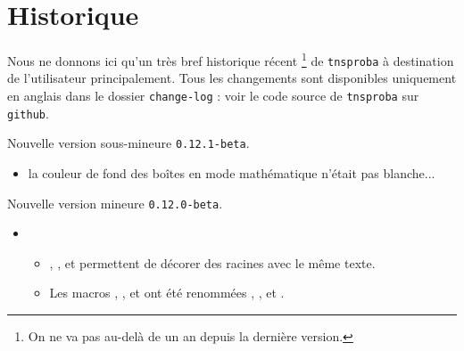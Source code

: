 \documentclass[12pt,a4paper]{article}
\begin{document}
\newpage

\section{Historique}

Nous ne donnons ici qu'un très bref historique récent
\footnote{
	On ne va pas au-delà de un an depuis la dernière version.
}
de \verb+tnsproba+ à destination de l'utilisateur principalement.
Tous les changements sont disponibles uniquement en anglais dans le dossier \verb+change-log+ : voir le code source de \verb+tnsproba+ sur \verb+github+.

\begin{description}

    \medskip
    \item[2021-03-23] Nouvelle version sous-mineure \verb+0.12.1-beta+.
    
    \begin{itemize}[itemsep=.5em]
        \item {}
              la couleur de fond des boîtes en mode mathématique n'était pas blanche...
    \end{itemize}
    
    
    \separation


    \medskip
    \item[2020-09-28] Nouvelle version mineure \verb+0.12.0-beta+.
    
    \begin{itemize}[itemsep=.5em]
        \item {}
    
        \begin{itemize}[itemsep=.5em]
    		\item {}, ,  et  permettent de décorer des racines avec le même texte.
    
            \item Les macros , ,  et  ont été renommées , ,  et .
        \end{itemize}
    \end{itemize}
    
    
    \separation


\end{description}
\end{document}
